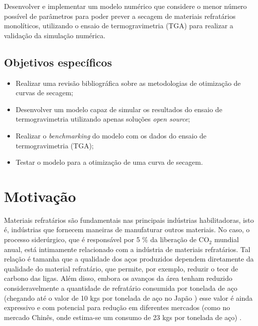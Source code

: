     Desenvolver e implementar um modelo numérico que considere o menor número
    possível de parâmetros para poder prever a secagem de materiais refratários
    monolíticos, utilizando o ensaio de termogravimetria (TGA) para realizar a
    validação da simulação numérica.
        
    \subsection{Objetivos específicos}
        
    \begin{itemize}
    \item Realizar uma revisão bibliográfica sobre as metodologias de otimização
      de curvas de secagem;
        
    \item Desenvolver um modelo capaz de simular os resultados do ensaio de
      termogravimetria utilizando apenas soluções \textit{open source};
        
    \item Realizar o \textit{benchmarking} do modelo com os dados do ensaio de
      termogravimetria (TGA);
        
    \item Testar o modelo para a otimização de uma curva de secagem.
    \end{itemize}
        
\section{Motivação}
Materiais refratários são fundamentais nas principais indústrias habilitadoras,
isto é, indústrias que fornecem maneiras de manufaturar outros materiais. No
caso, o processo siderúrgico, que é responsável por 5 \% \cite{Davis2018} da
liberação de CO$_2$ mundial anual, está intimamente relacionado com a indústria
de materiais refratários. Tal relação é tamanha que a qualidade dos aços
produzidos dependem diretamente da qualidade do material refratário, que
permite, por exemplo, reduzir o teor de carbono das ligas. Além disso, embora os
avanços da área tenham reduzido consideravelmente a quantidade de refratário
consumida por tonelada de aço (chegando até o valor de 10 kgs por tonelada de aço
no Japão \cite{Report2003}) esse valor é ainda expressivo e com potencial para redução em
diferentes mercados (como no mercado Chinês, onde estima-se um consumo de 23 kgs
por tonelada de aço) \cite{refperton}.

